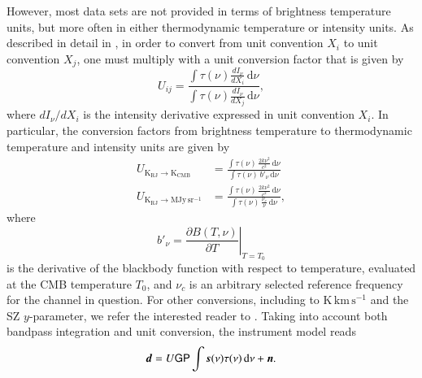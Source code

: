 \documentclass[onecolumn]{aa}
\renewcommand{\d}[0]{\vec{d}}
\newcommand{\n}[0]{\vec{n}}
\newcommand{\s}[0]{\vec{s}}
\renewcommand{\P}[0]{\tens{P}}
\renewcommand{\G}[0]{\tens{G}}
\begin{document}
However, most data sets are not provided in terms of brightness
temperature units, but more often in either thermodynamic temperature
or intensity units. As described in detail in
\citet{planck2013-p03d}, in order to convert from unit
convention $X_i$ to unit convention $X_j$, one must multiply with a
unit conversion factor that is given by
\begin{equation}
U_{ij} = \frac{\int \tau(\nu)\frac{dI_{\nu}}{dX_i}\, \mathrm d\nu}{\int
  \tau(\nu)\frac{dI_{\nu}}{dX_j}\,\mathrm d\nu},
\end{equation}
where $dI_{\nu}/dX_i$ is the intensity derivative expressed in unit convention
$X_i$. In particular, the conversion factors from brightness
temperature to thermodynamic temperature and intensity units are given
by
\begin{align}
U_{\mathrm{K}_{\mathrm{RJ}}\rightarrow \mathrm{K}_{\mathrm{CMB}}} &= \frac{\int
  \tau(\nu)\,\frac{2k\nu^2}{c^2}\,\mathrm d\nu}{\int \tau(\nu)\,b'_{\nu}\,
  \mathrm d\nu}\\
U_{\mathrm{K}_{\mathrm{RJ}}\rightarrow \mathrm{MJy}\,\mathrm{sr}^{-1}} &= \frac{\int
  \tau(\nu)\,\frac{2k\nu^2}{c^2}\,\mathrm d\nu}{\int
    \tau(\nu)\,\frac{\nu_c}{\nu}\,\mathrm d\nu},
\end{align}
where
\begin{equation}
  b'_{\nu} = \left.\frac{\partial B(T,\nu)}{\partial T}\right|_{T=T_0}
\end{equation}
is the derivative of the blackbody function with respect to
temperature, evaluated at the CMB temperature $T_0$, and $\nu_c$ is an
arbitrary selected reference frequency for the channel in
question. For other conversions, including to
$\mathrm{K}\,\mathrm{km}\,\mathrm{s}^{-1}$ and the SZ $y$-parameter,
we refer the interested reader to \citet{planck2013-p03d}. Taking into
account both bandpass integration and unit conversion, the instrument
model reads
\begin{equation}
  \d = U \G\P\int \s(\nu)\tau(\nu)\,\mathrm d\nu + \n.
  \label{eq:unit}
\end{equation}
\end{document}
